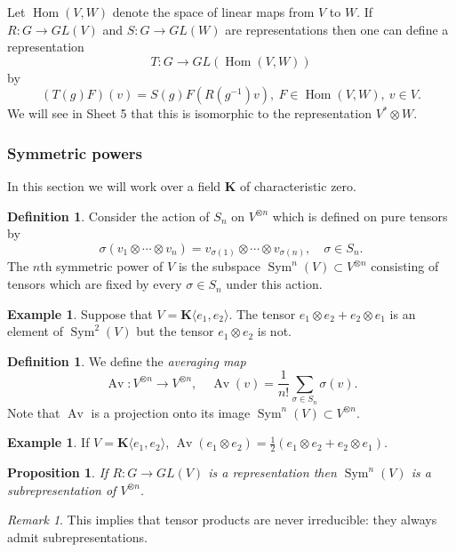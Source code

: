 \documentclass[12pt]{article}
\newcommand{\KK}{\mathbf{K}}
\newcommand{\OP}{\operatorname}
\newtheorem{prp}[thm]{Proposition}
\theoremstyle{definition}
\newtheorem{dfn}[thm]{Definition}
\newtheorem{exm}[thm]{Example}
\theoremstyle{check}
\theoremstyle{remark}
\newtheorem{rmk}[thm]{Remark}
\theoremstyle{TheoremNum}
\begin{document}
Let $\OP{Hom}(V,W)$ denote the space of linear maps from $V$ to $W$. If $R\colon G\to GL(V)$ and $S\colon G\to GL(W)$ are representations then one can define a representation
\[T\colon G\to GL(\OP{Hom}(V,W))\]
by
\[(T(g)F)(v)=S(g)F(R(g^{-1})v),\ F\in \OP{Hom}(V,W),\ v\in V.\]
We will see in Sheet 5 that this is isomorphic to the representation $V^*\otimes W$.

\subsubsection{Symmetric powers}

In this section we will work over a field $\KK$ of characteristic zero.
\begin{dfn}
Consider the action of $S_n$ on $V^{\otimes n}$ which is defined on pure tensors by
\[\sigma(v_1\otimes\cdots\otimes v_n)=v_{\sigma(1)}\otimes\cdots\otimes v_{\sigma(n)},\quad\sigma\in S_n.\]
The $n$th symmetric power of $V$ is the subspace $\OP{Sym}^n(V)\subset V^{\otimes n}$ consisting of tensors which are fixed by every $\sigma\in S_n$ under this action.
\end{dfn}
\begin{exm}
Suppose that $V=\KK\langle e_1,e_2\rangle$. The tensor $e_1\otimes e_2+e_2\otimes e_1$ is an element of $\OP{Sym}^2(V)$ but the tensor $e_1\otimes e_2$ is not.
\end{exm}
\begin{dfn}
We define the {\em averaging map}
\[\OP{Av}\colon V^{\otimes n}\to V^{\otimes n},\quad\OP{Av}(v)=\frac{1}{n!}\sum_{\sigma\in S_n}\sigma(v).\]
Note that $\OP{Av}$ is a projection onto its image $\OP{Sym}^n(V)\subset V^{\otimes n}$.
\end{dfn}
\begin{exm}
If $V=\KK\langle e_1,e_2\rangle$, $\OP{Av}(e_1\otimes e_2)=\frac{1}{2}(e_1\otimes e_2+e_2\otimes e_1)$.
\end{exm}
\begin{prp}
If $R\colon G\to GL(V)$ is a representation then $\OP{Sym}^n(V)$ is a subrepresentation of $V^{\otimes n}$.
\end{prp}
\begin{rmk}
This implies that tensor products are never irreducible: they always admit subrepresentations.
\end{rmk}
\end{document}
